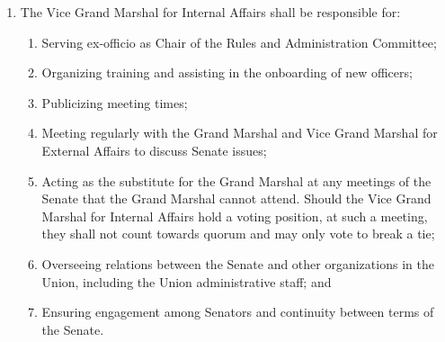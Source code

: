 \begin{enumerate}
  \begin{enumerate}
  \item Overseeing the Senate’s role in campus advocacy, becoming familiar with the advocacy work of all Senate committees, and serving as an assistant to committee chairs and members on advocacy work;
  \item Meeting regularly with the Grand Marshal and Vice Grand Marshal for Internal Affairs to discuss Senate issues;
  \item Serving, as may be necessary, as a liaison to members of the Institute administration to set up meetings and coordinate joint advocacy projects between committees;
  \item Serving as a substitute for the Grand Marshal at meetings with Institute administrators as may be requested by the Grand Marshal;
  \item Providing guidance and assistance in special operations to raise awareness of issues of importance to students, in collaboration with relevant bodies of the Senate;
  \item Assisting individual Senators that have been charged with investigating issues raised by petition; and
  \item Creating and maintaining documentation to strengthen committee advocacy work.
  \end{enumerate}
\item The Vice Grand Marshal for Internal Affairs shall be responsible for:
  \begin{enumerate}
  \item Serving ex-officio as Chair of the Rules and Administration Committee;
  \item Organizing training and assisting in the onboarding of new officers;
  \item Publicizing meeting times;
  \item Meeting regularly with the Grand Marshal and Vice Grand Marshal for External Affairs to discuss Senate issues;
  \item Acting as the substitute for the Grand Marshal at any meetings of the Senate that the Grand Marshal cannot attend. Should the Vice Grand Marshal for Internal Affairs hold a voting position, at such a meeting, they shall not count towards quorum and may only vote to break a tie;
  \item Overseeing relations between the Senate and other organizations in the Union, including the Union administrative staff; and
  \item Ensuring engagement among Senators and continuity between terms of the Senate.

\end{enumerate}
\end{enumerate}
